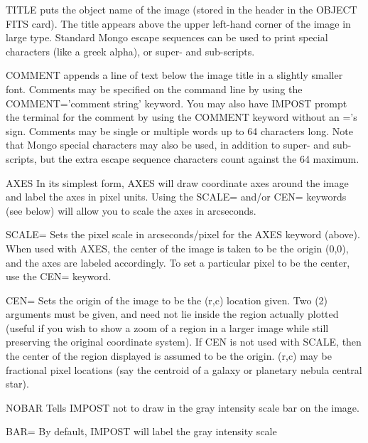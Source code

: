 {\newpage\clearpage
{}%
\begin{example}
  \item[TITLE]{puts the object name of the image (stored in the header in
          the OBJECT FITS card).  The title appears above the upper
          left-hand corner of the image in large type.  Standard 
          Mongo escape sequences can be used to print special characters
          (like a greek alpha), or super- and sub-scripts.}
  \item[COMMENT]{appends a line of text below the image title in a slightly
          smaller font.  Comments may be specified on the command line
          by using the COMMENT='comment string' keyword.  You may also
          have IMPOST prompt the terminal for the comment by using
          the COMMENT keyword without an ='s sign.  Comments may be 
          single or multiple words up to 64 characters long.  Note that
          Mongo special characters may also be used, in addition to 
          super- and sub-scripts, but the extra escape sequence characters
          count against the 64 maximum.}
  \item[AXES]{In its simplest form, AXES will draw coordinate axes around
          the image and label the axes in pixel units.  Using the
          SCALE= and/or CEN= keywords (see below) will allow you
          to scale the axes in arcseconds.}
  \item[SCALE= ]{Sets the pixel scale in arcseconds/pixel for the AXES 
          keyword (above).  When used with AXES, the center of
          the image is taken to be the origin (0,0), and the axes
          are labeled accordingly.  To set a particular pixel to be
          the center, use the CEN= keyword.}
  \item[CEN=]{Sets the origin of the image to be the (r,c) location given.
          Two (2) arguments must be given, and need not lie inside the
          region actually plotted (useful if you wish to show a zoom of
          a region in a larger image while still preserving the original
          coordinate system).  If CEN is not used with SCALE, then the
          center of the region displayed is assumed to be the origin.
          (r,c) may be fractional pixel locations (say the centroid of
          a galaxy or planetary nebula central star).}
  \item[NOBAR]{Tells IMPOST not to draw in the gray intensity scale bar
          on the image. }
  \item[BAR=]{By default, IMPOST will label the gray intensity scale
}
\end{example}}
